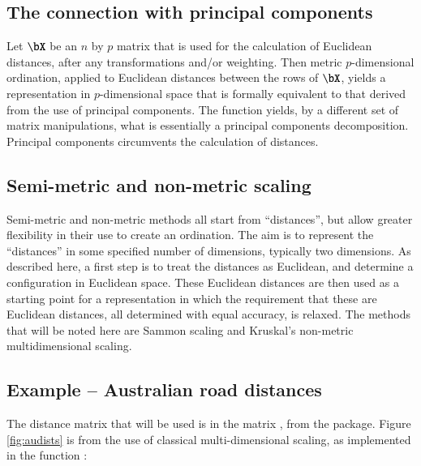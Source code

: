 \subsection*{The connection with principal components}
Let $\bX$ be an $n$ by $p$ matrix that is used for the calculation of
Euclidean distances, after any transformations and/or weighting.
Then metric $p$-dimensional ordination, applied to Euclidean distances
between the rows of $\bX$, yields a representation in $p$-dimensional
space that is formally equivalent to that derived from the use of
principal components.  The function  yields, by a
different set of matrix manipulations, what is essentially a principal
components decomposition.  Principal components circumvents the
calculation of distances.

\subsection*{Semi-metric and non-metric scaling}

Semi-metric and non-metric methods all start from ``distances'', but
allow greater flexibility in their use to create an ordination. The
aim is to represent the ``distances'' in some specified number of
dimensions, typically two dimensions.  As described here, a first step
is to treat the distances as Euclidean, and determine a configuration
in Euclidean space.  These Euclidean distances are then used as a
starting point for a representation in which the requirement that
these are Euclidean distances, all determined with equal accuracy, is
relaxed.  The methods that will be noted here are Sammon scaling and
Kruskal's non-metric multidimensional scaling.

\subsection*{Example -- Australian road distances}
The distance matrix that will be used is in the matrix ,
from the  package.  Figure \ref{fig:audists} is from the
use of classical multi-dimensional scaling, as implemented in the
function :

